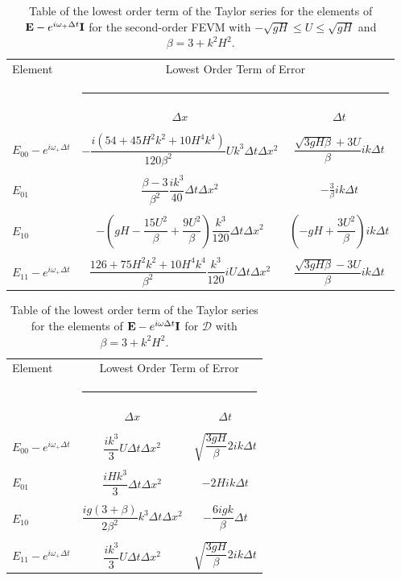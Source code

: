 \begin{table}
	\begin{tabular}{l  c c}
		Element & \multicolumn{2}{c}{Lowest Order Term of Error}\\
		&  \multicolumn{2}{l}{\rule{0.7\textwidth}{0.4pt}} \\
		& $\Delta x$&$\Delta t$\\
		\hline && \\
		$E_{00} -  e^{i \omega_+ \Delta t} $& $ -\dfrac{i \left(54 + 45H^2k^2 + 10H^4k^4\right)}{120\beta^2} U k^3 \Delta t \Delta x^2$ & $\dfrac{\sqrt{3gH \beta} + 3U}{\beta} ik \Delta t$ \\ & & \\
		$E_{01}$& $ \dfrac{\beta - 3}{\beta^2} \dfrac{ik^3}{40} \Delta  t\Delta x^2$ &  $ - \frac{3}{\beta} ik\Delta t$ \\ & & \\
		$E_{10}$& $ -\left(gH - \dfrac{15U^2}{\beta} + \dfrac{9U^2}{\beta}\right)  \dfrac{k^3}{120}\Delta t\Delta x^2$ &  $ \left(-gH + \dfrac{3U^2}{\beta}\right)ik \Delta t$ \\ & & \\
		$E_{11} -  e^{i \omega_+ \Delta t}$& $ \dfrac{126 + 75H^2 k^2 + 10 H^4 k^4}{\beta^2} \dfrac{k^3}{120} i U \Delta t\Delta x^2$ & $\dfrac{\sqrt{3gH \beta} - 3U}{\beta} ik \Delta t$ \\ 
	\end{tabular}
	\caption{Table of the lowest order term of the Taylor series for the elements of $\mathbf{E} - e^{i \omega_+ \Delta t} \mathbf{I}$ for the second-order FEVM with $ -\sqrt{gH} \le U \le \sqrt{gH}$ and $\beta = 3 + k^2 H^2$.}
	\label{tab:EerrFEVM2} 
\end{table}

\begin{table}
	\begin{tabular}{l  c c}
		Element & \multicolumn{2}{c}{Lowest Order Term of Error}\\
		&  \multicolumn{2}{l}{\rule{0.7\textwidth}{0.4pt}} \\
		& $\Delta x$&$\Delta t$\\
		\hline && \\
		$E_{00} -  e^{i \omega_+ \Delta t} $&  $\dfrac{ik^3}{3} U \Delta t \Delta x^2$ & $ \sqrt{\dfrac{3gH}{\beta}} 2ik \Delta t $ \\ & & \\
		$E_{01}$& $\dfrac{iHk^3}{3} \Delta t \Delta x^2$ &  $-2Hi k \Delta t$ \\ & & \\
		$E_{10}$& $ \dfrac{ig \left(3 + \beta\right)}{2\beta^2} k^3\Delta t \Delta x^2$ &  $ -\dfrac{6igk}{\beta} \Delta t$ \\ & & \\
		$E_{11} -  e^{i \omega_+ \Delta t}$& $\dfrac{ik^3}{3} U \Delta t \Delta x^2$ & $ \sqrt{\dfrac{3gH}{\beta}} 2ik \Delta t $ \\ 
	\end{tabular}
	\caption{Table of the lowest order term of the Taylor series for the elements of $\mathbf{E} - e^{i \omega \Delta t} \mathbf{I}$ for $\mathcal{D}$ with $\beta = 3 + k^2 H^2$.}
	\label{tab:EerrD} 
\end{table}

